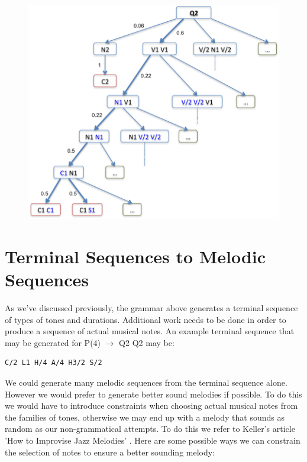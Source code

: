 \documentclass[pdftex,12pt,a4paper]{report}
\begin{document}
\begin{figure}[here]
  \centering
  \includegraphics[scale=0.8]{figure/Q2parsetree.png}
  \label{fig:Q2parsetree}
\end{figure}

\section{Terminal Sequences to Melodic Sequences} \label{terminalsequences}
As we've discussed previously, the grammar above generates a terminal sequence of types of tones and durations. Additional work needs to be done in order to produce a sequence of actual musical notes. An example terminal sequence that may be generated for P(4) $\rightarrow$ Q2 Q2 may be:

\begin{verbatim}
C/2 L1 H/4 A/4 H3/2 S/2
\end{verbatim}

We could generate many melodic sequences from the terminal sequence alone. However we would prefer to generate better sound melodies if possible. To do this we would have to introduce constraints when choosing actual musical notes from the families of tones, otherwise we may end up with a melody that sounds as random as our non-grammatical attempts. To do this we refer to Keller's article 'How to Improvise Jazz Melodies' \cite{jazzkeller}. Here are some possible ways we can constrain the selection of notes to ensure a better sounding melody:
\end{document}
